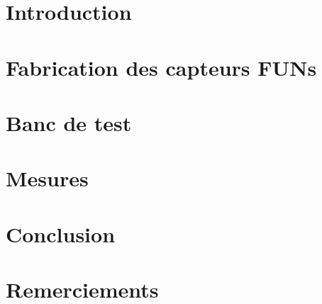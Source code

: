 \documentclass[
    iai & comatec, %
    mi, %
]{heig-tb}
\begin{document}
\maketitle
\frontmatter
\clearemptydoublepage

\preamble
\authentification

\begin{abstract}
    
\end{abstract}

\clearemptydoublepage
{
    \tableofcontents
    \let\cleardoublepage\clearpage
    \listoffigures
    \let\cleardoublepage\clearpage
    \listoftables
    \let\cleardoublepage\clearpage
    \listoflistings
}

\printnomenclature
\clearemptydoublepage
{}

\label{glossaire}
\printnoidxglossary

\mainmatter
\chapter{Introduction}

%

\chapter{Fabrication des capteurs FUNs}


\chapter{Banc de test}


\chapter{Mesures}


\chapter{Conclusion}


\chapter{Remerciements}

\end{document}

